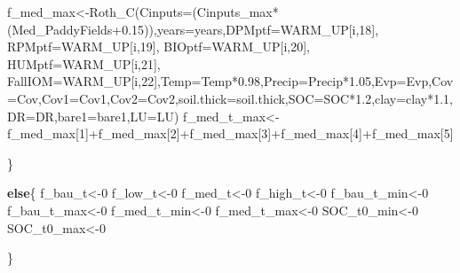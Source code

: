 \documentclass[
  10pt,
  b5paper,
]{book}
\newenvironment{Shaded}{\begin{snugshade}}{\end{snugshade}}
\newcommand{\AttributeTok}[1]{\textcolor[rgb]{0.77,0.63,0.00}{#1}}
\newcommand{\ControlFlowTok}[1]{\textcolor[rgb]{0.13,0.29,0.53}{\textbf{#1}}}
\newcommand{\DecValTok}[1]{\textcolor[rgb]{0.00,0.00,0.81}{#1}}
\newcommand{\FloatTok}[1]{\textcolor[rgb]{0.00,0.00,0.81}{#1}}
\newcommand{\FunctionTok}[1]{\textcolor[rgb]{0.00,0.00,0.00}{#1}}
\newcommand{\NormalTok}[1]{#1}
\newcommand{\OtherTok}[1]{\textcolor[rgb]{0.56,0.35,0.01}{#1}}
\newcommand{\SpecialCharTok}[1]{\textcolor[rgb]{0.00,0.00,0.00}{#1}}
\begin{document}
\begin{Shaded}
\begin{Highlighting}[]
\NormalTok{f\_med\_max}\OtherTok{\textless{}{-}}\FunctionTok{Roth\_C}\NormalTok{(}\AttributeTok{Cinputs=}\NormalTok{(Cinputs\_max}\SpecialCharTok{*}\NormalTok{(Med\_PaddyFields}\FloatTok{+0.15}\NormalTok{)),}\AttributeTok{years=}\NormalTok{years,}\AttributeTok{DPMptf=}\NormalTok{WARM\_UP[i,}\DecValTok{18}\NormalTok{], }\AttributeTok{RPMptf=}\NormalTok{WARM\_UP[i,}\DecValTok{19}\NormalTok{], }\AttributeTok{BIOptf=}\NormalTok{WARM\_UP[i,}\DecValTok{20}\NormalTok{], }\AttributeTok{HUMptf=}\NormalTok{WARM\_UP[i,}\DecValTok{21}\NormalTok{], }\AttributeTok{FallIOM=}\NormalTok{WARM\_UP[i,}\DecValTok{22}\NormalTok{],}\AttributeTok{Temp=}\NormalTok{Temp}\SpecialCharTok{*}\FloatTok{0.98}\NormalTok{,}\AttributeTok{Precip=}\NormalTok{Precip}\SpecialCharTok{*}\FloatTok{1.05}\NormalTok{,}\AttributeTok{Evp=}\NormalTok{Evp,}\AttributeTok{Cov=}\NormalTok{Cov,}\AttributeTok{Cov1=}\NormalTok{Cov1,}\AttributeTok{Cov2=}\NormalTok{Cov2,}\AttributeTok{soil.thick=}\NormalTok{soil.thick,}\AttributeTok{SOC=}\NormalTok{SOC}\SpecialCharTok{*}\FloatTok{1.2}\NormalTok{,}\AttributeTok{clay=}\NormalTok{clay}\SpecialCharTok{*}\FloatTok{1.1}\NormalTok{,}\AttributeTok{DR=}\NormalTok{DR,}\AttributeTok{bare1=}\NormalTok{bare1,}\AttributeTok{LU=}\NormalTok{LU)}
\NormalTok{f\_med\_t\_max}\OtherTok{\textless{}{-}}\NormalTok{f\_med\_max[}\DecValTok{1}\NormalTok{]}\SpecialCharTok{+}\NormalTok{f\_med\_max[}\DecValTok{2}\NormalTok{]}\SpecialCharTok{+}\NormalTok{f\_med\_max[}\DecValTok{3}\NormalTok{]}\SpecialCharTok{+}\NormalTok{f\_med\_max[}\DecValTok{4}\NormalTok{]}\SpecialCharTok{+}\NormalTok{f\_med\_max[}\DecValTok{5}\NormalTok{]}

\NormalTok{\}}

\ControlFlowTok{else}\NormalTok{\{}
\NormalTok{f\_bau\_t}\OtherTok{\textless{}{-}}\DecValTok{0}
\NormalTok{f\_low\_t}\OtherTok{\textless{}{-}}\DecValTok{0}
\NormalTok{f\_med\_t}\OtherTok{\textless{}{-}}\DecValTok{0}
\NormalTok{f\_high\_t}\OtherTok{\textless{}{-}}\DecValTok{0}
\NormalTok{f\_bau\_t\_min}\OtherTok{\textless{}{-}}\DecValTok{0}
\NormalTok{f\_bau\_t\_max}\OtherTok{\textless{}{-}}\DecValTok{0}
\NormalTok{f\_med\_t\_min}\OtherTok{\textless{}{-}}\DecValTok{0}
\NormalTok{f\_med\_t\_max}\OtherTok{\textless{}{-}}\DecValTok{0}
\NormalTok{SOC\_t0\_min}\OtherTok{\textless{}{-}}\DecValTok{0}
\NormalTok{SOC\_t0\_max}\OtherTok{\textless{}{-}}\DecValTok{0}

\NormalTok{\}}



\end{Highlighting}
\end{Shaded}
\end{document}
